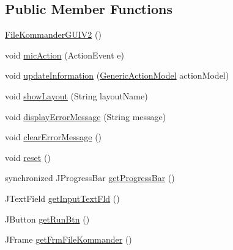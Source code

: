 \subsection*{Public Member Functions}
\begin{DoxyCompactItemize}
\item 
\hyperlink{classcom_1_1poly_1_1nlp_1_1filekommander_1_1views_1_1_file_kommander_g_u_i_v2_a909ed6c8cf9b61f338669efb018aebcc}{File\-Kommander\-G\-U\-I\-V2} ()
\item 
void \hyperlink{classcom_1_1poly_1_1nlp_1_1filekommander_1_1views_1_1_file_kommander_g_u_i_v2_a126562cb457bcbe6d535a855686ae5c2}{mic\-Action} (Action\-Event e)
\item 
void \hyperlink{classcom_1_1poly_1_1nlp_1_1filekommander_1_1views_1_1_file_kommander_g_u_i_v2_ab9b5987afa8d8dca0e22c0010ae098b3}{update\-Information} (\hyperlink{interfacecom_1_1poly_1_1nlp_1_1filekommander_1_1views_1_1models_1_1_generic_action_model}{Generic\-Action\-Model} action\-Model)
\item 
void \hyperlink{classcom_1_1poly_1_1nlp_1_1filekommander_1_1views_1_1_file_kommander_g_u_i_v2_a2109c6426970100fa2ce8f5cb4ae91a5}{show\-Layout} (String layout\-Name)
\item 
void \hyperlink{classcom_1_1poly_1_1nlp_1_1filekommander_1_1views_1_1_file_kommander_g_u_i_v2_a5802448ae2926a341882f6919c25b767}{display\-Error\-Message} (String message)
\item 
void \hyperlink{classcom_1_1poly_1_1nlp_1_1filekommander_1_1views_1_1_file_kommander_g_u_i_v2_a86255900a1c24746463406401904b846}{clear\-Error\-Message} ()
\item 
void \hyperlink{classcom_1_1poly_1_1nlp_1_1filekommander_1_1views_1_1_file_kommander_g_u_i_v2_a218d1052cb79ee763ef17322145ccff0}{reset} ()
\item 
synchronized J\-Progress\-Bar \hyperlink{classcom_1_1poly_1_1nlp_1_1filekommander_1_1views_1_1_file_kommander_g_u_i_v2_a472a223056b8a110dd3ca1d376d38e4b}{get\-Progress\-Bar} ()
\item 
J\-Text\-Field \hyperlink{classcom_1_1poly_1_1nlp_1_1filekommander_1_1views_1_1_file_kommander_g_u_i_v2_aed87552f95c1a57c9175d75a6b8d4de5}{get\-Input\-Text\-Fld} ()
\item 
J\-Button \hyperlink{classcom_1_1poly_1_1nlp_1_1filekommander_1_1views_1_1_file_kommander_g_u_i_v2_afa1a6e4ff00aac9b2e81db569ea399f5}{get\-Run\-Btn} ()
\item 
J\-Frame \hyperlink{classcom_1_1poly_1_1nlp_1_1filekommander_1_1views_1_1_file_kommander_g_u_i_v2_a8935aa619a9b244658921c26466b772a}{get\-Frm\-File\-Kommander} ()

\end{DoxyCompactItemize}
